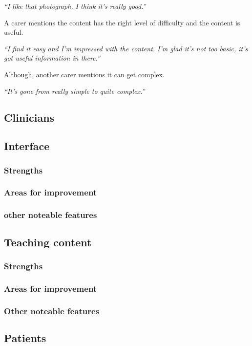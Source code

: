 \documentclass{sigchi}
\begin{document}
\textit{“I like that photograph, I think it’s really good.”}

A carer mentions the content has the right level of difficulty and the content is useful. 

\textit{“I find it easy and I’m impressed with the content. I’m glad it’s not too basic, it’s got useful information in there.”}

Although, another carer mentions it can get complex.

\textit{“It’s gone from really simple to quite complex.”}

\subsection{Clinicians}

\subsection{Interface}
\subsubsection{Strengths}
\subsubsection{Areas for improvement}
\subsubsection{other noteable features}

\subsection{Teaching content}
\subsubsection{Strengths}
\subsubsection{Areas for improvement}
\subsubsection{Other noteable features}

\subsection{Patients}
\end{document}
